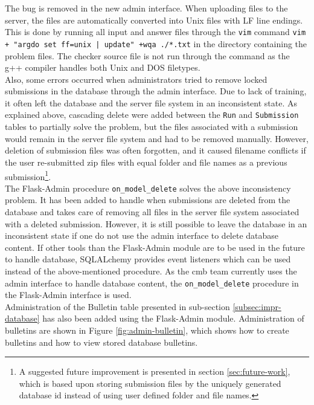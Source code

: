 The bug is removed in the new admin interface. When uploading files to the server, the files are automatically converted into Unix files with LF line endings. This is done by running all input and answer files through the \texttt{vim} \cite{VIM} command \texttt{vim + "argdo set ff=unix | update" +wqa ./*.txt} in the directory containing the problem files. The checker source file is not run through the command as the g++ compiler handles both Unix and DOS filetypes. \\

Also, some errors occurred when administrators tried to remove locked submissions in the database through the admin interface. Due to lack of training, it often left the database and the server file system in an inconsistent state. As explained above, cascading delete were added between the \texttt{Run} and \texttt{Submission} tables to partially solve the problem, but the files associated with a submission would remain in the server file system and had to be removed manually. However, deletion of submission files was often forgotten, and it caused filename conflicts if the user re-submitted zip files with equal folder and file names as a previous submission\footnote{A suggested future improvement is presented in section \ref{sec:future-work}, which is based upon storing submission files by the uniquely generated database id instead of using user defined folder and file names.}.\\

The Flask-Admin \cite{FLASKADMIN} procedure \texttt{on\_model\_delete} solves the above inconsistency problem. It has been added to handle when submissions are deleted from the database and takes care of removing all files in the server file system associated with a deleted submission. However, it is still possible to leave the database in an inconsistent state if one do not use the admin interface to delete database content. If other tools than the Flask-Admin module are to be used in the future to handle database, SQLALchemy provides event listeners which can be used instead of the above-mentioned procedure. As the \gls{cmb} team currently uses the admin interface to handle database content, the \texttt{on\_model\_delete} procedure in the Flask-Admin interface is used. \\

Administration of the Bulletin table presented in sub-section \ref{subsec:impr-database} has also been added using the Flask-Admin module. Administration of bulletins are shown in Figure \ref{fig:admin-bulletin}, which shows how to create bulletins and how to view stored database bulletins.

